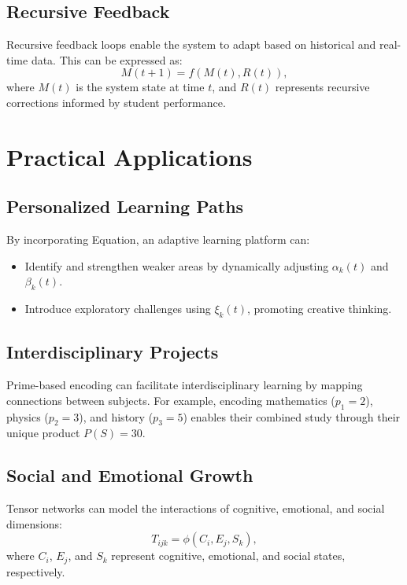 \documentclass[11pt]{article}
\theoremstyle{plain}
\theoremstyle{definition}
\begin{document}
\subsection{Recursive Feedback}
Recursive feedback loops enable the system to adapt based on historical and real-time data. This can be expressed as:
\begin{equation}
M(t+1) = f(M(t), R(t)),
\end{equation}
where \( M(t) \) is the system state at time \( t \), and \( R(t) \) represents recursive corrections informed by student performance.

\section{Practical Applications}

\subsection{Personalized Learning Paths}
By incorporating Equation, an adaptive learning platform can:
\begin{itemize}
    \item Identify and strengthen weaker areas by dynamically adjusting \( \alpha_k(t) \) and \( \beta_k(t) \).
    \item Introduce exploratory challenges using \( \xi_k(t) \), promoting creative thinking.
\end{itemize}

\subsection{Interdisciplinary Projects}
Prime-based encoding can facilitate interdisciplinary learning by mapping connections between subjects. For example, encoding mathematics (\( p_1 = 2 \)), physics (\( p_2 = 3 \)), and history (\( p_3 = 5 \)) enables their combined study through their unique product \( P(S) = 30 \).

\subsection{Social and Emotional Growth}
Tensor networks can model the interactions of cognitive, emotional, and social dimensions:
\begin{equation}
T_{ijk} = \phi(C_i, E_j, S_k),
\end{equation}
where \( C_i \), \( E_j \), and \( S_k \) represent cognitive, emotional, and social states, respectively.
\end{document}
